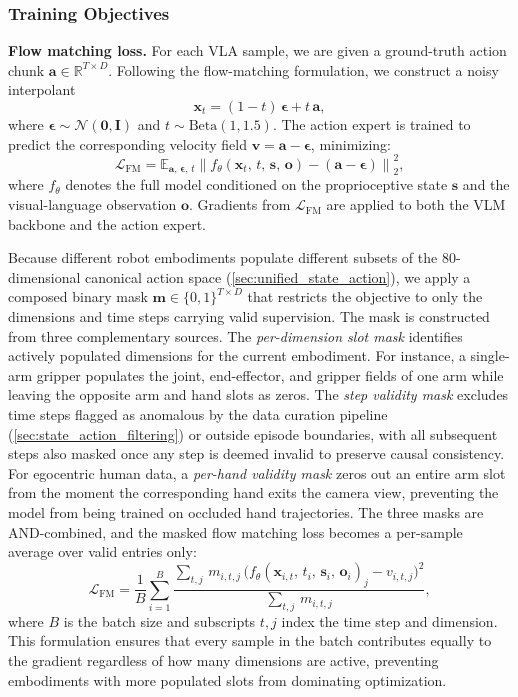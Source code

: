 \subsubsection{Training Objectives}

\textbf{Flow matching loss.}
For each VLA sample, we are given a ground-truth action chunk $\mathbf{a} \in \mathbb{R}^{T \times D}$. Following the flow-matching formulation, we construct a noisy interpolant
\[
\mathbf{x}_t = (1-t)\,\boldsymbol{\epsilon} + t\,\mathbf{a},
\]
where $\boldsymbol{\epsilon} \sim \mathcal{N}(\mathbf{0}, \mathbf{I})$ and $t \sim \mathrm{Beta}(1, 1.5)$. The action expert is trained to predict the corresponding velocity field $\mathbf{v} = \mathbf{a} - \boldsymbol{\epsilon}$, minimizing:
\begin{equation}
    \mathcal{L}_{\mathrm{FM}} = \mathbb{E}_{\mathbf{a},\,\boldsymbol{\epsilon},\,t}
        \left\| f_\theta\!\left(\mathbf{x}_t,\, t,\, \mathbf{s},\, \mathbf{o}\right) - \left(\mathbf{a} - \boldsymbol{\epsilon}\right) \right\|_2^2,
    \label{eq:fm_loss}
\end{equation}
where $f_\theta$ denotes the full model conditioned on the proprioceptive state $\mathbf{s}$ and the visual-language observation $\mathbf{o}$. Gradients from $\mathcal{L}_{\mathrm{FM}}$ are applied to both the VLM backbone and the action expert.

Because different robot embodiments populate different subsets of the 80-dimensional canonical action space (\cref{sec:unified_state_action}), 
we apply a composed binary mask $\mathbf{m} \in \{0,1\}^{T \times D}$ that restricts the objective to only the dimensions and time steps carrying valid supervision.
The mask is constructed from three complementary sources.
The \emph{per-dimension slot mask} identifies actively populated dimensions for the current embodiment. For instance, a single-arm gripper populates the joint, end-effector, and gripper fields of one arm while leaving the opposite arm and hand slots as zeros.
The \emph{step validity mask} excludes time steps flagged as anomalous by the data curation pipeline (\cref{sec:state_action_filtering}) or outside episode boundaries, with all subsequent steps also masked once any step is deemed invalid to preserve causal consistency.
For egocentric human data, a \emph{per-hand validity mask} zeros out an entire arm slot from the moment the corresponding hand exits the camera view, preventing the model from being trained on occluded hand trajectories.
The three masks are AND-combined, and the masked flow matching loss becomes a per-sample average over valid entries only:
\begin{equation}
    \mathcal{L}_{\mathrm{FM}} = \frac{1}{B}\sum_{i=1}^{B}
        \frac{\sum_{t,j}\, m_{i,t,j}\,\bigl(f_\theta(\mathbf{x}_{i,t},\, t_i,\, \mathbf{s}_i,\, \mathbf{o}_i)_{j} - v_{i,t,j}\bigr)^2}
             {\sum_{t,j}\, m_{i,t,j}},
    \label{eq:fm_loss_masked}
\end{equation}
where $B$ is the batch size and subscripts $t,j$ index the time step and dimension.
This formulation ensures that every sample in the batch contributes equally to the gradient regardless of how many dimensions are active, preventing embodiments with more populated slots from dominating optimization.

